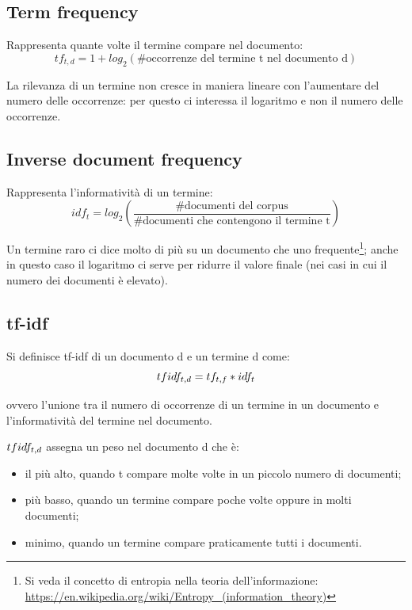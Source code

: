 \subsection{Term frequency}
Rappresenta quante volte il termine compare nel documento:
\begin{equation}
    tf_{t,d} = 1 + log_2(\text{\#occorrenze del termine t nel documento d})
\end{equation}

La rilevanza di un termine non cresce in maniera lineare con l'aumentare del numero delle occorrenze: per questo ci interessa il logaritmo e non il numero delle occorrenze.

\subsection{Inverse document frequency}
Rappresenta l'informatività di un termine:
\begin{equation}
    idf_t = log_2(\frac{\text{\#documenti del corpus}}{\text{\#documenti che contengono il termine t}})
\end{equation}

Un termine raro ci dice molto di più su un documento che uno frequente\footnote{Si veda il concetto di entropia nella teoria dell'informazione: \url{https://en.wikipedia.org/wiki/Entropy_(information_theory)}}; anche in questo caso il logaritmo ci serve per ridurre il valore finale (nei casi in cui il numero dei documenti è elevato).

\subsection{tf-idf}
Si definisce tf-idf di un documento d e un termine d come:
    \begin{equation}
        tf\-idf_{t,d} = tf_{t,f} * idf_{t}
    \end{equation} 

ovvero l'unione tra il numero di occorrenze di un termine in un documento e l'informatività del termine nel documento.

$tf\-idf_{t,d}$ assegna un peso nel documento d che è:
\begin{itemize}
    \item il più alto, quando t compare molte volte in un piccolo numero di documenti;
    \item più basso, quando un termine compare poche volte oppure in molti documenti;
    \item minimo, quando un termine compare praticamente tutti i documenti.
\end{itemize}

